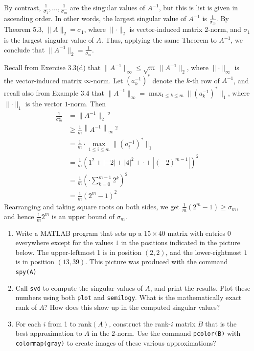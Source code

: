 \documentclass[12pt]{article}
\newenvironment{ex}[2][Exercise]{\begin{trivlist}
		\item[\hskip \labelsep {\bfseries #1}\hskip \labelsep {\bfseries #2.}]}{\end{trivlist}}
\newenvironment{sol}[1][Solution]{\begin{trivlist}
		\item[\hskip \labelsep {\bfseries #1:}]}{\end{trivlist}}
\begin{document}
\begin{sol}
\begin{enumerate}[label=(\alph*)]
		
		By contrast, $\frac{1}{\sigma_1},\ldots,\frac{1}{\sigma_m}$ are the singular values of $A^{-1}$,
		but this is list is given in ascending order. In other words, the largest  singular value of
		$A^{-1}$ is $\frac{1}{\sigma_m}$. By Theorem 5.3, $\lVert A\rVert_2=\sigma_1$, where $\lVert\cdot\rVert_2$
		is vector-induced matrix 2-norm, and $\sigma_1$ is the largest singular value of $A$. Thus,
		applying the same Theorem to $A^{-1}$, we conclude that $\lVert A^{-1}\rVert_2 =\frac{1}{\sigma_m}$.
		
		Recall from Exercise 3.3(d) that $\lVert A^{-1}\rVert_\infty\leq \sqrt{m}\ \lVert A^{-1}\rVert_2$,
		where $\lVert \cdot \rVert_\infty$ is the vector-induced matrix $\infty$-norm.
		Let $(a^{-1}_k)^*$ denote the $k$-th row of $A^{-1}$, and recall also from Example 3.4 that
		$\lVert A^{-1}\rVert_\infty=\max_{1\leq k\leq m}\lVert (a^{-1}_k)^*\rVert_1$, where
		$\lVert \cdot\rVert_1$ is the vector $1$-norm. Then
		\begin{align*}
			\frac{1}{\sigma_m^2}&=\lVert A^{-1}\rVert_2\ ^2\\
			&\geq \frac{1}{m}\left\lVert A^{-1}\right\rVert_\infty\ ^2\\
			&=\frac{1}{m}\cdot \max_{1\leq i\leq m}\lVert (a_i^{-1})^*\rVert_1\\
			&=\frac{1}{m}\left(1^2 + |-2| + |4|^2+\cdot+|(-2)^{m-1}|\right)^2\\
			&=\frac{1}{m}\left(\cdot \sum_{k=0}^{m-1}2^k\right)^2\\
			&=\frac{1}{m}(2^m-1)^2
		\end{align*}
		Rearranging and taking square roots on both sides, we get $\frac{1}{m}(2^m-1)\geq \sigma_m$,
		and hence $\frac{1}{m}2^m$ is an upper bound of $\sigma_m$.
	\end{enumerate}
\end{sol}

\begin{ex}{3}
	\begin{enumerate}[label=(\alph*)]
		\item Write a MATLAB program that sets up a $15\times 40$ matrix with entries 0 everywhere except
		for the values $1$ in the positions indicated in the picture below. The upper-leftmost 1 is in
		position $(2,2)$, and the lower-rightmost $1$ is in position $(13,39)$. This picture was produced
		with the command \texttt{spy(A)}
		\item Call \texttt{svd} to compute the singular values of $A$, and print the results. Plot these
		numbers using both \texttt{plot} and \texttt{semilogy}. What is the mathematically exact rank of
		$A$? How does this show up in the computed singular values?
		\item For each $i$ from 1 to $\text{rank}(A)$, construct the rank-$i$ matrix $B$ that is the best
		approximation to $A$ in the $2$-norm. Use the command \texttt{pcolor(B)} with \texttt{colormap(gray)}
		to create images of these various approximations?
	\end{enumerate}
\end{ex}
\end{document}
